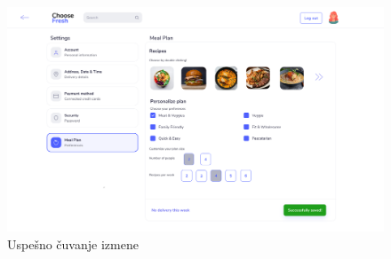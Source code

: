 \begin{figure}[H]
	\begin{center}
		\includegraphics[width=\textwidth]{UI/meal_plan_success.png}
    		\caption{Uspešno čuvanje izmene}
    \label{fig:MealPlanSuccess}
    \end{center}
\end{figure}